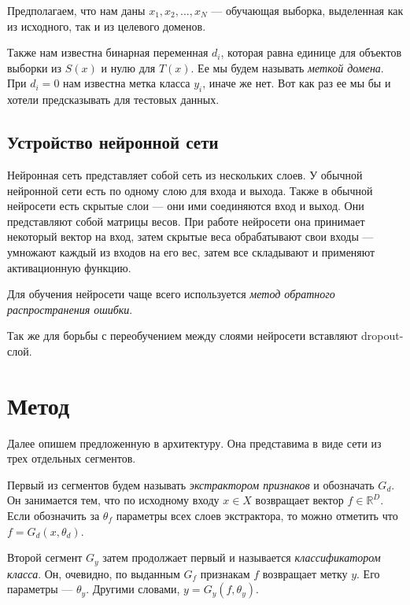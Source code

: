 \documentclass[14pt]{extarticle}
\begin{document}
Предполагаем, что нам даны ${x_1, x_2, ..., x_N}$ — обучающая выборка, выделенная как из исходного, так и из целевого доменов.

 Также нам известна бинарная переменная $d_i$, которая равна единице для объектов выборки из $S(x)$ и нулю для $T(x)$. Ее мы будем называть \textit{меткой домена}. При $d_i = 0$ нам известна метка класса $y_i$, иначе же нет. Вот как раз ее мы бы и хотели предсказывать для тестовых данных.

\subsection{Устройство нейронной сети}

Нейронная сеть представляет собой сеть из нескольких слоев. У обычной нейронной сети есть по одному слою для входа и выхода. Также в обычной нейросети есть скрытые слои — они ими соединяются вход и выход. Они представляют собой матрицы весов. При работе нейросети она принимает некоторый вектор на вход, затем скрытые веса обрабатывают свои входы — умножают каждый из входов на его вес, затем все складывают и применяют активационную функцию. 

Для обучения нейросети чаще всего используется \textit{метод обратного распространения ошибки}. 

Так же для борьбы с переобучением между слоями нейросети вставляют dropout-слой. 

\newpage
\section{Метод}
 
Далее опишем предложенную в \cite{ganin} архитектуру. Она представима в виде сети из трех отдельных сегментов.
 
Первый из сегментов будем называть \textit{экстрактором признаков} и обозначать $G_d$. Он занимается тем, что по исходному входу $x \in X$ возвращает вектор $f \in \mathbb{R}^D$. Если обозначить за $\theta_f$ параметры всех слоев экстрактора, то можно отметить что $f = G_d(x, \theta_d)$.
 
Второй сегмент $G_y$ затем продолжает первый и называется \textit{классификатором класса}. Он, очевидно, по выданным $G_f$ признакам $f$ возвращает метку $y$. Его параметры — $\theta_y$. Другими словами, $y = G_y(f, \theta_y)$.
 
\end{document}
